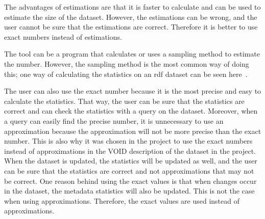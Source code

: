 The advantages of estimations are that it is faster to calculate and can be used to estimate the size of the dataset. However, the estimations can be wrong, and the user cannot be sure that the estimations are correct. Therefore it is better to use exact numbers instead of estimations.

The tool can be a program that calculates or uses a sampling method to estimate the number. However, the sampling method is the most common way of doing this; one way of calculating the statistics on an \gls{rdf} dataset can be seen here~\cite{zneika2016rdf}.

The user can also use the exact number because it is the most precise and easy to calculate the statistics. That way, the user can be sure that the statistics are correct and can check the statistics with a query on the dataset. Moreover, when a query can easily find the precise number, it is unnecessary to use an approximation because the approximation will not be more precise than the exact number.
This is also why it was chosen in the project to use the exact numbers instead of approximations in the VOID description of the dataset in the project. When the dataset is updated, the statistics will be updated as well, and the user can be sure that the statistics are correct and not approximations that may not be correct. One reason behind using the exact values is that when changes occur in the dataset, the metadata statistics will also be updated. This is not the case when using approximations. Therefore, the exact values are used instead of approximations.




